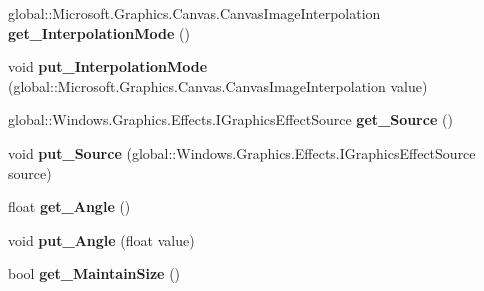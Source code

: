 \begin{DoxyCompactItemize}
global\+::\+Microsoft.\+Graphics.\+Canvas.\+Canvas\+Image\+Interpolation {\bfseries get\+\_\+\+Interpolation\+Mode} ()
\item 
\mbox{\label{interface_microsoft_1_1_graphics_1_1_canvas_1_1_effects_1_1_i_straighten_effect_ac4bd6a5d0b94a9b353c7cf0854c55f83}} 
void {\bfseries put\+\_\+\+Interpolation\+Mode} (global\+::\+Microsoft.\+Graphics.\+Canvas.\+Canvas\+Image\+Interpolation value)
\item 
\mbox{\label{interface_microsoft_1_1_graphics_1_1_canvas_1_1_effects_1_1_i_straighten_effect_a24ea3cfd1f2bd3a3cff7beeb3a4788a4}} 
global\+::\+Windows.\+Graphics.\+Effects.\+I\+Graphics\+Effect\+Source {\bfseries get\+\_\+\+Source} ()
\item 
\mbox{\label{interface_microsoft_1_1_graphics_1_1_canvas_1_1_effects_1_1_i_straighten_effect_a70f0d6dc9433d17ebdcbe3a4b6b4892c}} 
void {\bfseries put\+\_\+\+Source} (global\+::\+Windows.\+Graphics.\+Effects.\+I\+Graphics\+Effect\+Source source)
\item 
\mbox{\label{interface_microsoft_1_1_graphics_1_1_canvas_1_1_effects_1_1_i_straighten_effect_a4420ccc230f5230df15709e5ac5d785a}} 
float {\bfseries get\+\_\+\+Angle} ()
\item 
\mbox{\label{interface_microsoft_1_1_graphics_1_1_canvas_1_1_effects_1_1_i_straighten_effect_ab42c88ed4087e8529feb2aad22332b17}} 
void {\bfseries put\+\_\+\+Angle} (float value)
\item 
\mbox{\label{interface_microsoft_1_1_graphics_1_1_canvas_1_1_effects_1_1_i_straighten_effect_a42af54b41b4e4299bb05315818ce7183}} 
bool {\bfseries get\+\_\+\+Maintain\+Size} ()
\item 
\mbox{\label{interface_microsoft_1_1_graphics_1_1_canvas_1_1_effects_1_1_i_straighten_effect_a0d1aa7dfd257a41c147868cb49446ea6}} 

\end{DoxyCompactItemize}
